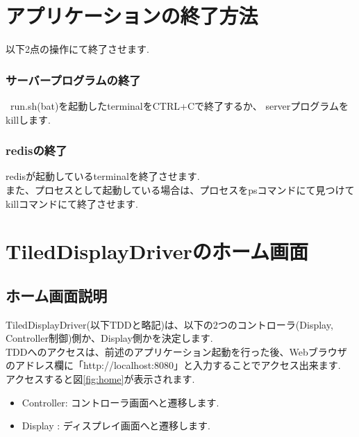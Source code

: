\documentclass[a4paper,10pt,oneside]{jsbook}
\begin{document}
\chapter{アプリケーションの終了方法}

以下2点の操作にて終了させます.\\

\subsection{サーバープログラムの終了}\
run.sh(bat)を起動したterminalをCTRL+Cで終了するか、
serverプログラムをkillします.\\


\subsection{redisの終了}
redisが起動しているterminalを終了させます.\\
また、プロセスとして起動している場合は、プロセスをpsコマンドにて見つけて
killコマンドにて終了させます.\\

\newpage

\chapter{TiledDisplayDriverのホーム画面}
\section{ホーム画面説明}
TiledDisplayDriver(以下TDDと略記)は、以下の2つのコントローラ(Display, Controller制御)側か、Display側かを決定します.\\
TDDへのアクセスは、前述のアプリケーション起動を行った後、Webブラウザのアドレス欄に「http://localhost:8080」と入力することでアクセス出来ます.\\
アクセスすると図\ref{fig:home}が表示されます.

\begin{itemize}
\item Controller: コントローラ画面へと遷移します.\\
\item Display   : ディスプレイ画面へと遷移します.\\
\end{itemize}
\end{document}
